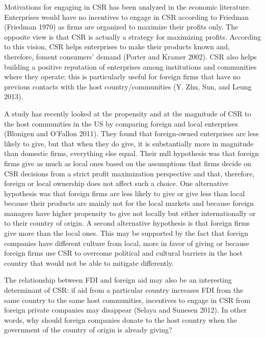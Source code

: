 \documentclass[]{article}
\begin{document}
Motivations for engaging in CSR has been analyzed in the economic
literature. Enterprises would have no incentives to engage in CSR
according to Friedman (Friedman 1970) as firms are organized to maximize
their profits only. The opposite view is that CSR is actually a strategy
for maximizing profits. According to this vision, CSR helps enterprises
to make their products known and, therefore, foment consumers' demand
(Porter and Kramer 2002). CSR also helps building a positive reputation
of enterprises among institutions and communities where they operate:
this is particularly useful for foreign firms that have no previous
contacts with the host country/communities (Y. Zhu, Sun, and Leung
2013).

A study has recently looked at the propensity and at the magnitude of
CSR to the host communities in the US by comparing foreign and local
enterprises (Blonigen and O'Fallon 2011). They found that foreign-owned
enterprises are less likely to give, but that when they do give, it is
substantially more in magnitude than domestic firms, everything else
equal. Their null hypothesis was that foreign firms give as much as
local ones based on the assumptions that firms decide on CSR decisions
from a strict profit maximization perspective and that, therefore,
foreign or local ownership does not affect such a choice. One
alternative hypothesis was that foreign firms are less likely to give or
give less than local because their products are mainly not for the local
markets and because foreign managers have higher propensity to give not
locally but either internationally or to their country of origin. A
second alternative hypothesis is that foreign firms give more than the
local ones. This may be supported by the fact that foreign companies
have different culture from local, more in favor of giving or because
foreign firms use CSR to overcome political and cultural barriers in the
host country that would not be able to mitigate differently.

The relationship between FDI and foreign aid may also be an interesting
determinant of CSR: if aid from a particular country increases FDI from
the same country to the same host communities, incentives to engage in
CSR from foreign private companies may disappear (Selaya and Sunesen
2012). In other words, why should foreign companies donate to the host
country when the government of the country of origin is already giving?
\end{document}
